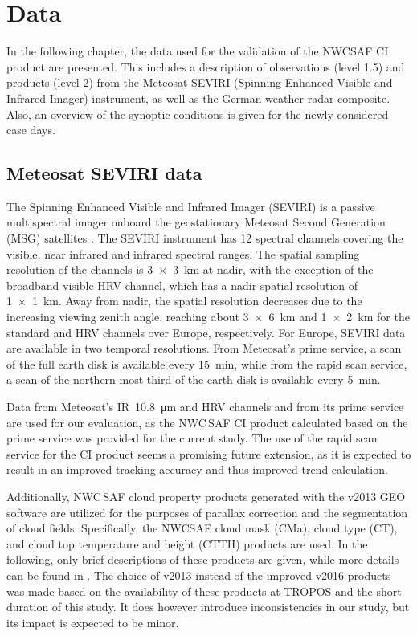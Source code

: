 \chapter{Data}
In the following chapter, the data used for the validation of the NWCSAF CI product are presented. This includes a description of observations (level 1.5) and products (level 2) from the Meteosat SEVIRI (Spinning Enhanced Visible and Infrared Imager) instrument, as well as the German weather radar composite. Also, an overview of the synoptic conditions is given for the newly considered case days.

\section{Meteosat SEVIRI data}
The Spinning Enhanced Visible and Infrared Imager (SEVIRI) is a passive multispectral imager onboard the geostationary Meteosat Second Generation (MSG) satellites \citep{Schmetz2002}. The SEVIRI instrument has 12 spectral channels covering the visible, near infrared and infrared spectral ranges. The spatial sampling resolution of the channels is \SI{3x3}{\kilo\metre} at nadir, with the exception of the broadband visible HRV channel, which has a nadir spatial resolution of \SI{1x1}{\kilo\metre}. Away from nadir, the spatial resolution decreases due to the increasing viewing zenith angle, reaching about \SI{3x6}{\kilo\metre} and \SI{1x2}{\kilo\metre} for the standard and HRV channels over Europe, respectively. For Europe, SEVIRI data are available in two temporal resolutions. From Meteosat's prime service, a scan of the full earth disk is available every \SI{15}{\minute}, while from the rapid scan service, a scan of the northern-most third of the earth disk is available every \SI{5}{\minute}.

Data from Meteosat's IR~\SI{10.8}{\micro\metre} and HRV channels and from its prime service are used for our evaluation, as the NWC\,SAF CI product calculated based on the prime service was provided for the current study. The use of the rapid scan service for the CI product seems a promising future extension, as it is expected to result in an improved tracking accuracy and thus improved trend calculation.

Additionally, NWC\,SAF cloud property products generated with the v2013 GEO software are utilized for the purposes of parallax correction and the segmentation of cloud fields. Specifically, the NWCSAF  cloud mask (CMa), cloud type (CT), and cloud top temperature and height (CTTH) products are used. In the following, only brief descriptions of these products are given, while more details can be found in \citet{NWCSAFWolken2014}. The choice of v2013 instead of the improved v2016 products was made based on the availability of these products at TROPOS and the short duration of this study. It does however introduce inconsistencies in our study, but its impact is expected to be minor.

